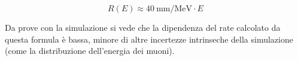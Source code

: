 \begin{equation}
	R(E) \approx \SI{40}{\mm\per\MeV} \cdot E
	\label{eq:range_elec}
\end{equation}

Da prove con la simulazione si vede che la dipendenza del rate calcolato da questa formula \`e bassa, minore di altre incertezze intrinseche della simulazione (come la distribuzione dell'energia dei muoni).
